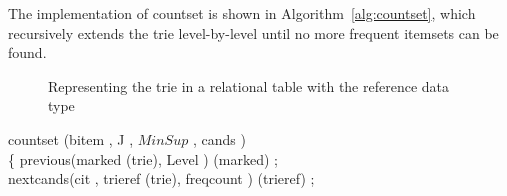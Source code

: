{The implementation of {\bw countset} is shown in
Algorithm~\ref{alg:countset}, which recursively extends the trie
level-by-level until no more frequent itemsets can be found.

\begin{figure}[htb]
\caption{Representing the trie in a relational table with the reference data type}
\end{figure}

{\renewcommand{\baselinestretch}{1}
\normalsize

\begin{algorithm}[!htb]
\begin{algorithmic}[1]

\STATE{} countset (bitem , J , $MinSup$ , cands )\\
\STATE\{\hspace{.1cm} previous(marked (trie), Level )
 (marked) ; \\
\STATE\hspace{.3cm} nextcands(cit , trieref (trie),
freqcount ) (trieref) ;\\


\end{algorithmic}
\end{algorithm}}}
